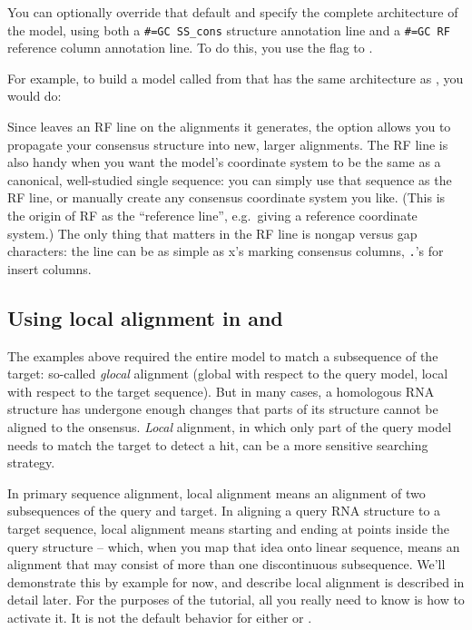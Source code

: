 You can optionally override that default and specify the complete
architecture of the model, using both a {\small\verb+#=GC SS_cons+}
structure annotation line and a {\small\verb+#=GC RF+} reference
column annotation line.  To do this, you use the  flag to
.

For example, to build a model called  from
 that has the same architecture as , you
would do:


Since  leaves an RF line on the alignments it generates,
the  option allows you to propagate your consensus
structure into new, larger alignments. The RF line is also handy when
you want the model's coordinate system to be the same as a canonical,
well-studied single sequence: you can simply use that sequence as the
RF line, or manually create any consensus coordinate system you like.
(This is the origin of RF as the ``reference line'', e.g.\ giving a
reference coordinate system.) The only thing that matters in the RF
line is nongap versus gap characters: the line can be as simple as x's
marking consensus columns, \verb+.+'s for insert columns.

\subsection{Using local alignment in  and }

The examples above required the entire model to match a subsequence of
the target: so-called \emph{glocal} alignment (global with respect to
the query model, local with respect to the target sequence). But in
many cases, a homologous RNA structure has undergone enough changes
that parts of its structure cannot be aligned to the
onsensus. \emph{Local} alignment, in which only part of the query
model needs to match the target to detect a hit, can be a more
sensitive searching strategy.

In primary sequence alignment, local alignment means an alignment of
two subsequences of the query and target. In aligning a query RNA
structure to a target sequence, local alignment means starting and
ending at points inside the query structure -- which, when you map
that idea onto linear sequence, means an alignment that may consist of
more than one discontinuous subsequence. We'll demonstrate this by
example for now, and describe local alignment is described in detail
later.  For the purposes of the tutorial, all you really need to know
is how to activate it. It is not the default behavior for either
 or .

